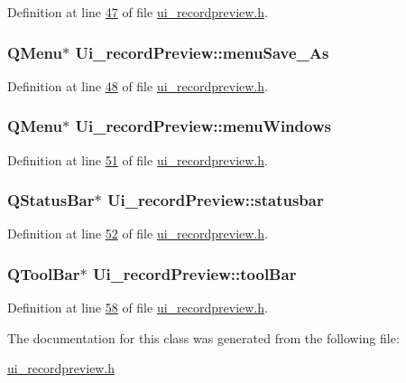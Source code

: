 Definition at line \hyperlink{a00053_source_l00047}{47} of file \hyperlink{a00053_source}{ui\+\_\+recordpreview.\+h}.

\hypertarget{a00028_aaf69c873ec3bf0ea397829122ca4a224}{
\subsubsection[{menu\+Save\+\_\+\+As}]{\setlength{\rightskip}{0pt plus 5cm}Q\+Menu$\ast$ Ui\+\_\+record\+Preview\+::menu\+Save\+\_\+\+As}}\label{a00028_aaf69c873ec3bf0ea397829122ca4a224}


Definition at line \hyperlink{a00053_source_l00048}{48} of file \hyperlink{a00053_source}{ui\+\_\+recordpreview.\+h}.

\hypertarget{a00028_afd93511da273fc2c6a88472d154cb176}{
\subsubsection[{menu\+Windows}]{\setlength{\rightskip}{0pt plus 5cm}Q\+Menu$\ast$ Ui\+\_\+record\+Preview\+::menu\+Windows}}\label{a00028_afd93511da273fc2c6a88472d154cb176}


Definition at line \hyperlink{a00053_source_l00051}{51} of file \hyperlink{a00053_source}{ui\+\_\+recordpreview.\+h}.

\hypertarget{a00028_a5573ce6bc38b919d995ee7927b66c223}{
\subsubsection[{statusbar}]{\setlength{\rightskip}{0pt plus 5cm}Q\+Status\+Bar$\ast$ Ui\+\_\+record\+Preview\+::statusbar}}\label{a00028_a5573ce6bc38b919d995ee7927b66c223}


Definition at line \hyperlink{a00053_source_l00052}{52} of file \hyperlink{a00053_source}{ui\+\_\+recordpreview.\+h}.

\hypertarget{a00028_ac94509c2cd16337592e1634b0f2a6020}{
\subsubsection[{tool\+Bar}]{\setlength{\rightskip}{0pt plus 5cm}Q\+Tool\+Bar$\ast$ Ui\+\_\+record\+Preview\+::tool\+Bar}}\label{a00028_ac94509c2cd16337592e1634b0f2a6020}


Definition at line \hyperlink{a00053_source_l00058}{58} of file \hyperlink{a00053_source}{ui\+\_\+recordpreview.\+h}.



The documentation for this class was generated from the following file\+:\begin{DoxyCompactItemize}
\item 
\hyperlink{a00053}{ui\+\_\+recordpreview.\+h}\end{DoxyCompactItemize}
